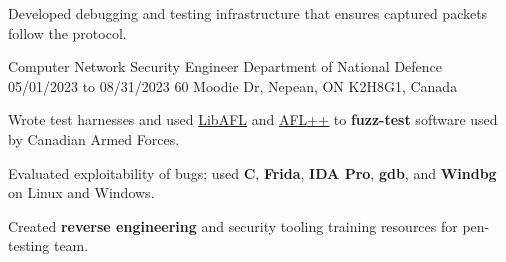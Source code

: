 \begin{cventries}
{\begin{cvitems}
        \item{Developed debugging and testing infrastructure that ensures captured packets follow the protocol.}
      \end{cvitems}
    }
  \cventry
    {Computer Network Security Engineer} %
    {Department of National Defence} %
    {05/01/2023 to 08/31/2023} %
    {60 Moodie Dr, Nepean, ON K2H8G1, Canada} %
    {
      \begin{cvitems} %
        \item{Wrote test harnesses and used \href{https://aflplus.plus/libafl-book/}{LibAFL} and \href{https://aflplus.plus}{AFL++} to \textbf{fuzz-test} software used by Canadian Armed Forces.}
        \item{Evaluated exploitability of bugs; used \textbf{C}, \textbf{Frida}, \textbf{IDA Pro}, \textbf{gdb}, and \textbf{Windbg} on Linux and Windows.}
        \item{Created \textbf{reverse engineering} and security tooling training resources for pen-testing team.} %
      \end{cvitems}
    }


\end{cventries}
